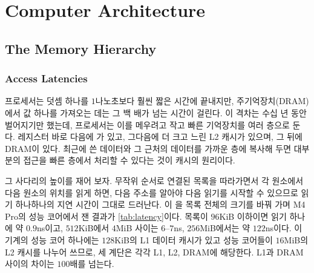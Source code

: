 \chapter{Computer Architecture}
\label{ch:architecture}


\section{The Memory Hierarchy}
\label{sec:memory-hierarchy}

\subsection{Access Latencies}

프로세서는 덧셈 하나를 $1$나노초보다 훨씬 짧은 시간에 끝내지만, 주기억장치(DRAM)에서 값 하나를 가져오는 데는 그 백 배가 넘는 시간이 걸린다. 이 격차는 수십 년 동안 벌어지기만 했는데\cite{wulf1995}, 프로세서는 이를 메우려고 작고 빠른 기억장치를 여러 층으로 둔다. 레지스터 바로 다음에 가 있고, 그다음에 더 크고 느린 L2 캐시가 있으며, 그 뒤에 DRAM이 있다. 최근에 쓴 데이터와 그 근처의 데이터를 가까운 층에 복사해 두면 대부분의 접근을 빠른 층에서 처리할 수 있다는 것이 캐시의 원리이다.

그 사다리의 높이를 재어 보자. 무작위 순서로 연결된 목록을 따라가면서 각 원소에서 다음 원소의 위치를 읽게 하면, 다음 주소를 알아야 다음 읽기를 시작할 수 있으므로 읽기 하나하나의 지연 시간이 그대로 드러난다. 이 을 목록 전체의 크기를 바꿔 가며 M4 Pro의 성능 코어에서 잰 결과가 \cref{tab:latency}이다. 목록이 $96$KiB 이하이면 읽기 하나에 약 $0.9$ns이고, $512$KiB에서 $4$MiB 사이는 $6$--$7$ns, $256$MiB에서는 약 $122$ns이다. 이 기계의 성능 코어 하나에는 $128$KiB의 L1 데이터 캐시가 있고 성능 코어들이 $16$MiB의 L2 캐시를 나누어 쓰므로, 세 계단은 각각 L1, L2, DRAM에 해당한다. L1과 DRAM 사이의 차이는 $100$배를 넘는다.

